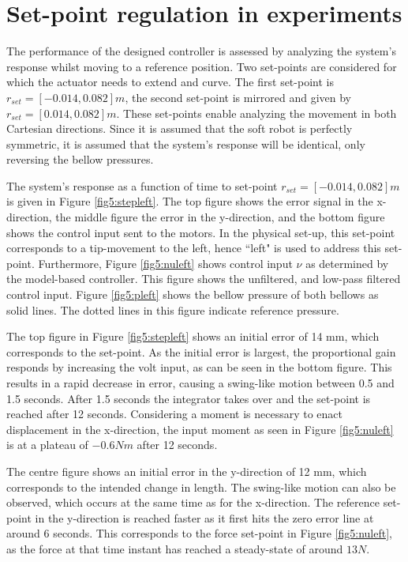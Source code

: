 \section{Set-point regulation in experiments}


The performance of the designed controller is assessed by analyzing the system's response whilst moving to a reference position. Two set-points are considered for which the actuator needs to extend and curve. The first set-point is $r_{set} = [-0.014,0.082] m$, the second set-point is mirrored and given by $r_{set} = [0.014,0.082] m$. These set-points enable analyzing the movement in both Cartesian directions. Since it is assumed that the soft robot is perfectly symmetric, it is assumed that the system's response will be identical, only reversing the bellow pressures. 

The system's response as a function of time to set-point $r_{set} = [-0.014,0.082] m$ is given in Figure \ref{fig5:stepleft}. The top figure shows the error signal in the x-direction, the middle figure the error in the y-direction, and the bottom figure shows the control input sent to the motors. In the physical set-up, this set-point corresponds to a tip-movement to the left, hence ``left"  is used to address this set-point. Furthermore, Figure \ref{fig5:nuleft} shows control input $\nu$ as determined by the model-based controller. This figure shows the unfiltered, and low-pass filtered control input. Figure \ref{fig5:pleft} shows the bellow pressure of both bellows as solid lines. The dotted lines in this figure indicate reference pressure.


The top figure in Figure \ref{fig5:stepleft} shows an initial error of 14 mm, which corresponds to the set-point. As the initial error is largest, the proportional gain responds by increasing the volt input, as can be seen in the bottom figure. This results in a rapid decrease in error, causing a swing-like motion between 0.5 and 1.5 seconds. After 1.5 seconds the integrator takes over and the set-point is reached after 12 seconds. Considering a moment is necessary to enact displacement in the x-direction, the input moment as seen in Figure \ref{fig5:nuleft} is at a plateau of $-0.6 Nm$ after 12 seconds. 

The centre figure shows an initial error in the y-direction of 12 mm, which corresponds to the intended change in length. The swing-like motion can also be observed, which occurs at the same time as for the x-direction. The reference set-point in the y-direction is reached faster as it first hits the zero error line at around 6 seconds. This corresponds to the force set-point in Figure \ref{fig5:nuleft}, as the force at that time instant has reached a steady-state of around $13N$. 

